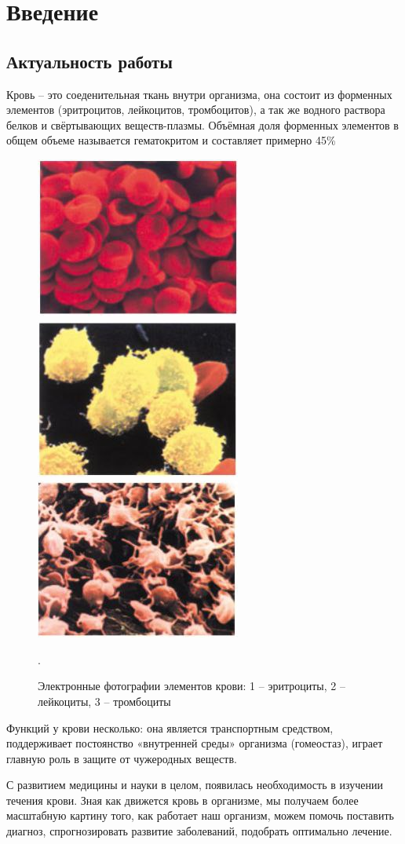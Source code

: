 \section{Введение}
\subsection{Актуальность работы}
Кровь -- это соеденительная ткань внутри организма, она состоит из форменных элементов (эритроцитов, лейкоцитов, тромбоцитов), а так же водного раствора белков и свёртывающих веществ-плазмы. Объёмная доля форменных элементов в общем объеме называется гематокритом и составляет примерно 45\%
\begin{figure}[h]
\centering
\includegraphics[width=0.3\linewidth]{erotr.jpg}
\includegraphics[width=0.3\linewidth]{leiko.jpg}
\includegraphics[width=0.3\linewidth]{trombo.jpg}
\caption{ Электронные фотографии элементов крови: 1 -- эритроциты, 2 -- лейкоциты, 3 -- тромбоциты \cite{rls:2003}}.
\label{fig:mpr}
\end{figure}
Функций у крови несколько: она является транспортным средством, поддерживает постоянство «внутренней среды» организма (гомеостаз), играет главную роль в защите от чужеродных веществ.

С развитием медицины и науки в целом, появилась необходимость в изучении течения крови. Зная как движется кровь в организме, мы получаем более масштабную картину того, как работает наш организм, можем помочь поставить диагноз, спрогнозировать развитие заболеваний, подобрать оптимально лечение.

